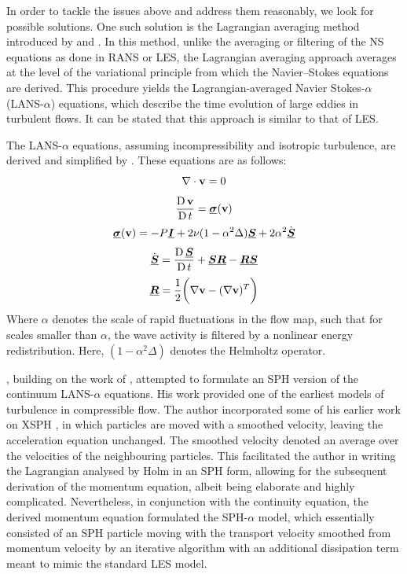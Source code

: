 In order to tackle the issues above and address them reasonably, we look for possible solutions. One such solution is the Lagrangian averaging method introduced by \cite{holm1998euler} and \cite{Marsden2001}. In this method, unlike the averaging or filtering of the NS equations as done in RANS or LES, the Lagrangian averaging approach averages at the level of the variational principle from which the Navier–Stokes equations are derived. This procedure yields the Lagrangian-averaged Navier Stokes-$\alpha$ (LANS-$\alpha$) equations, which describe the time evolution of large eddies in turbulent flows. It can be stated that this approach is similar to that of LES.

The LANS-$\alpha$ equations, assuming incompressibility and isotropic turbulence, are derived and simplified by \cite{Mohseni2003}. These equations are as follows:
\begin{equation}
    \nabla \cdot \mathbf{v} = 0
\end{equation}
\begin{equation}
    \frac{\operatorname{D} \mathbf{v}}{\operatorname{D} t} = \underline{\bm{\sigma}}(\mathbf{v})
\end{equation}
\begin{equation}
    \underline{\bm{\sigma}}(\mathbf{v}) = -P\underline{\bm{I}} + 2\nu(1 - \alpha^2\Delta)\underline{\bm{S}} + 2\alpha^2\Dot{\underline{\bm{S}}}
\end{equation}
\begin{equation}
    \Dot{\underline{\bm{S}}} = \frac{\operatorname{D} \underline{\bm{S}}}{\operatorname{D} t} + \underline{\bm{S}}\underline{\bm{R}} - \underline{\bm{R}}\underline{\bm{S}}
\end{equation}
\begin{equation}
    \underline{\bm{R}} = \frac{1}{2}\bigg(\nabla\mathbf{v}-(\nabla\mathbf{v})^T\bigg)
\end{equation}
Where $\alpha$ denotes the scale of rapid fluctuations in the flow map, such that for scales smaller than $\alpha$, the wave activity is filtered by a nonlinear energy redistribution. Here, $(1 - \alpha^2 \Delta)$ denotes the Helmholtz operator.

\cite{Monaghan2002}, building on the work of \cite{holm1998euler}, attempted to formulate an SPH version of the continuum LANS-$\alpha$ equations. His work provided one of the earliest models of turbulence in compressible flow. The author incorporated some of his earlier work on XSPH \parencite{monaghan1989problem}, in which particles are moved with a smoothed velocity, leaving the acceleration equation unchanged. The smoothed velocity denoted an average over the velocities of the neighbouring particles. This facilitated the author in writing the Lagrangian analysed by Holm in an SPH form, allowing for the subsequent derivation of the momentum equation, albeit being elaborate and highly complicated. Nevertheless, in conjunction with the continuity equation, the derived momentum equation formulated the SPH-$\alpha$ model, which essentially consisted of an SPH particle moving with the transport velocity smoothed from momentum velocity by an iterative algorithm with an additional dissipation term meant to mimic the standard LES model.

